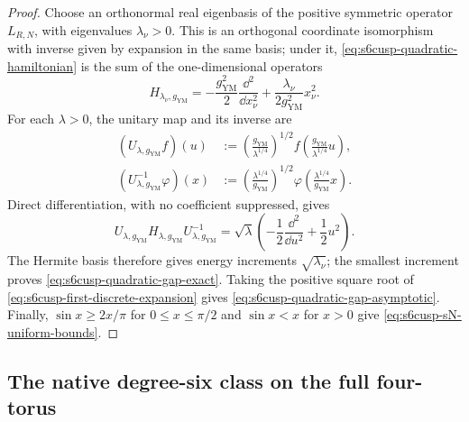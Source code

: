 \begin{proof}
Choose an orthonormal real eigenbasis of the positive symmetric operator
\(L_{R,N}\), with eigenvalues \(\lambda_\nu>0\).  This is an orthogonal
coordinate isomorphism with inverse given by expansion in the same basis;
under it, \eqref{eq:s6cusp-quadratic-hamiltonian} is the sum of the
one-dimensional operators
\[
 H_{\lambda_\nu,g_{\mathrm{YM}}}
 =-\frac{g_{\mathrm{YM}}^2}{2}\frac{\dd^2}{\dd x_\nu^2}
 +\frac{\lambda_\nu}{2g_{\mathrm{YM}}^2}x_\nu^2.
\]
For each \(\lambda>0\), the unitary map and its inverse are
\begin{align*}
 (U_{\lambda,g_{\mathrm{YM}}}f)(u)
 &:=
 \left(\frac{g_{\mathrm{YM}}}{\lambda^{1/4}}\right)^{1/2}
 f\left(\frac{g_{\mathrm{YM}}}{\lambda^{1/4}}u\right),\\
 (U_{\lambda,g_{\mathrm{YM}}}^{-1}\varphi)(x)
 &:=
 \left(\frac{\lambda^{1/4}}{g_{\mathrm{YM}}}\right)^{1/2}
 \varphi\left(\frac{\lambda^{1/4}}{g_{\mathrm{YM}}}x\right).
\end{align*}
Direct differentiation, with no coefficient suppressed, gives
\[
 U_{\lambda,g_{\mathrm{YM}}}
 H_{\lambda,g_{\mathrm{YM}}}
 U_{\lambda,g_{\mathrm{YM}}}^{-1}
 =
 \sqrt\lambda\left(
 -\frac12\frac{\dd^2}{\dd u^2}+\frac12u^2
 \right).
\]
The Hermite basis therefore gives energy increments
\(\sqrt{\lambda_\nu}\); the smallest increment proves
\eqref{eq:s6cusp-quadratic-gap-exact}.  Taking the positive square root of
\eqref{eq:s6cusp-first-discrete-expansion} gives
\eqref{eq:s6cusp-quadratic-gap-asymptotic}.  Finally,
\(\sin x\ge2x/\pi\) for \(0\le x\le\pi/2\) and
\(\sin x<x\) for \(x>0\) give \eqref{eq:s6cusp-sN-uniform-bounds}.
\end{proof}

\subsection{The native degree-six class on the full four-torus}
\label{subsec:s6cusp-native-four-dimensional-magnetic}

